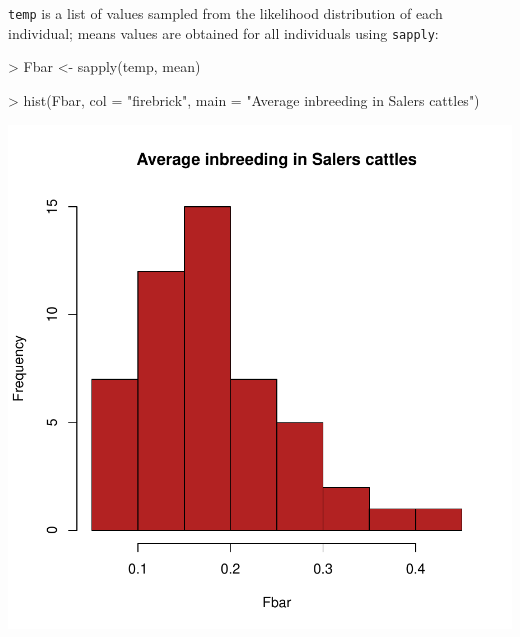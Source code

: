 \documentclass{article}
\begin{document}
\texttt{temp} is a list of values sampled from the likelihood distribution of each individual; means
values are obtained for all individuals using \texttt{sapply}:
\begin{Schunk}
\begin{Sinput}
> Fbar <- sapply(temp, mean)
\end{Sinput}
\end{Schunk}
\begin{Schunk}
\begin{Sinput}
> hist(Fbar, col = "firebrick", main = "Average inbreeding in Salers cattles")
\end{Sinput}
\end{Schunk}
\includegraphics{figs/base-068}
\end{document}
